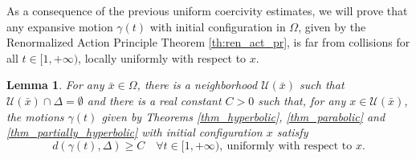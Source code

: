 \documentclass[a4paper,10pt]{amsart}
\theoremstyle{plain}
\newtheorem{lem}[thm]{Lemma}
\theoremstyle{definition}
\numberwithin{equation}{section}
\numberwithin{thm}{section}
\begin{document}
As a consequence of the previous uniform coercivity estimates, we will prove that any expansive motion $\gamma(t)$ with initial configuration in $\Omega$, given by the Renormalized Action Principle Theorem \ref{th:ren_act_pr}, is far from collisions for all $t\in[1,+\infty)$, locally uniformly with respect to $x$.

\begin{lem}\label{lemma_collisionless_minimal}
    For any $\bar x\in\Omega$, there is a neighborhood $\mathcal{U}(\bar x)$ such that $\mathcal{U}(\bar x)\cap\Delta=\emptyset$ and there is a real constant $C>0$ such that, for any $x\in \mathcal{U}(\bar x)$, the motions $\gamma(t)$ given by Theorems \ref{thm_hyperbolic}, \ref{thm_parabolic} and \ref{thm_partially_hyperbolic} with initial configuration $x$ satisfy
    \begin{equation}\label{collisionless_minimal_solutions}
        d(\gamma(t),\Delta)\geq C\quad\forall t\in[1,+\infty),\ \text{uniformly with respect to }x.    
    \end{equation}
    
\end{lem}
\end{document}
